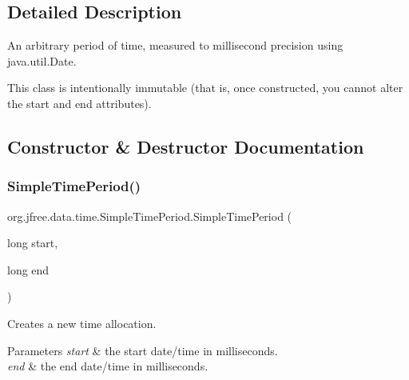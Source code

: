 \subsection{Detailed Description}
An arbitrary period of time, measured to millisecond precision using {\ttfamily java.\+util.\+Date}. 

This class is intentionally immutable (that is, once constructed, you cannot alter the start and end attributes). 

\subsection{Constructor \& Destructor Documentation}
\mbox{\label{classorg_1_1jfree_1_1data_1_1time_1_1_simple_time_period_a389b9f6b4826d714b30dadb9e28b6e04}} 
\subsubsection{\texorpdfstring{Simple\+Time\+Period()}{SimpleTimePeriod()}\hspace{0.1cm}{\footnotesize\ttfamily [1/2]}}
{\footnotesize\ttfamily org.\+jfree.\+data.\+time.\+Simple\+Time\+Period.\+Simple\+Time\+Period (\begin{DoxyParamCaption}\item[{long}]{start,  }\item[{long}]{end }\end{DoxyParamCaption})}

Creates a new time allocation.


\begin{DoxyParams}{Parameters}
{\em start} & the start date/time in milliseconds. \\
\hline
{\em end} & the end date/time in milliseconds. \\
\hline
\end{DoxyParams}
\mbox{\label{classorg_1_1jfree_1_1data_1_1time_1_1_simple_time_period_a94de9a015c3f3e1add30f776938d104b}} 
